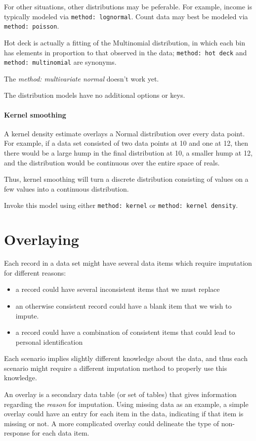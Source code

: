 \documentclass{article}
\begin{document}
For other situations, other distributions may be peferable. For example, income is
typically modeled via {\tt method: lognormal}. Count data may best be modeled via {\tt
method: poisson}.

Hot deck is actually a fitting of the Multinomial distribution, in which each bin has
elements in proportion to that observed in the data; {\tt method: hot deck} and {\tt
method: multinomial} are synonyms.

The {\em method: multivariate normal} doesn't work yet.

The distribution models have no additional options or keys.

\paragraph{Kernel smoothing} A kernel density estimate overlays a Normal distribution over
every data point. For example, if a data set consisted of two data points at 10 and one at
12, then there would be a large hump in the final distribution at 10, a smaller hump at
12, and the distribution would be continuous over the entire space of reals.

Thus, kernel smoothing will turn a discrete distribution consisting of values on a
few values into a continuous distribution.

Invoke this model using either {\tt method: kernel} or {\tt method: kernel density}.



\section{Overlaying}
Each record in a data set might have several data items which require imputation for
different reasons:
\begin{itemize}
\item a record could have several inconsistent items that we must replace
\item an otherwise consistent record could have a blank item that we wish to impute.
\item a record could have a combination of consistent items that could lead to personal identification
\end{itemize}
Each scenario implies slightly different knowledge about the data, and thus each scenario
might require a different imputation method to properly use this knowledge.

An overlay is a secondary data table (or set of tables) that gives information regarding
the \emph{reason} for imputation.  Using missing data as an example, a simple overlay
could have an entry for each item in the data, indicating if that item is missing or not.
A more complicated overlay could delineate the type of non-response for each data item.
\end{document}
